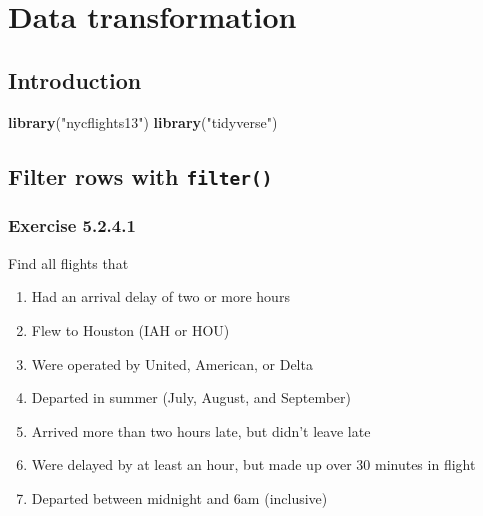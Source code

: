 \documentclass[]{book}
\newenvironment{Shaded}{\begin{snugshade}}{\end{snugshade}}
\newcommand{\KeywordTok}[1]{\textcolor[rgb]{0.13,0.29,0.53}{\textbf{#1}}}
\newcommand{\NormalTok}[1]{#1}
\newcommand{\StringTok}[1]{\textcolor[rgb]{0.31,0.60,0.02}{#1}}
\providecommand{\tightlist}{%
  \setlength{\itemsep}{0pt}\setlength{\parskip}{0pt}}
\theoremstyle{plain}
\theoremstyle{remark}
\begin{document}
\hypertarget{data-transformation}{%
\chapter{Data transformation}\label{data-transformation}}

\hypertarget{introduction-2}{%
\section{Introduction}\label{introduction-2}}

\begin{Shaded}
\begin{Highlighting}[]
\KeywordTok{library}\NormalTok{(}\StringTok{"nycflights13"}\NormalTok{)}
\KeywordTok{library}\NormalTok{(}\StringTok{"tidyverse"}\NormalTok{)}
\end{Highlighting}
\end{Shaded}

\hypertarget{filter-rows-with-filter}{%
\section{\texorpdfstring{Filter rows with \texttt{filter()}}{Filter rows with filter()}}\label{filter-rows-with-filter}}

\hypertarget{exercise-5.2.4.1}{%
\subsection*{\texorpdfstring{Exercise {5.2.4.1}}{Exercise 5.2.4.1}}\label{exercise-5.2.4.1}}

Find all flights that

\begin{enumerate}
\def\labelenumi{\arabic{enumi}.}
\tightlist
\item
  Had an arrival delay of two or more hours
\item
  Flew to Houston (IAH or HOU)
\item
  Were operated by United, American, or Delta
\item
  Departed in summer (July, August, and September)
\item
  Arrived more than two hours late, but didn't leave late
\item
  Were delayed by at least an hour, but made up over 30 minutes in flight
\item
  Departed between midnight and 6am (inclusive)
\end{enumerate}
\end{document}
